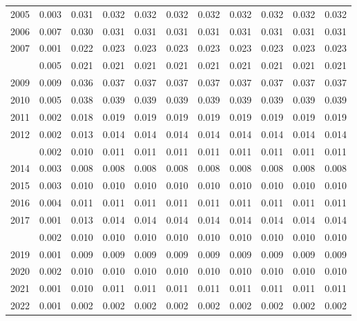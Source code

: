 \documentclass[
]{article}
\begin{document}
\begin{longtable}[t]{lrrrrrrrrrr}
2005 & 0.003 & 0.031 & 0.032 & 0.032 & 0.032 & 0.032 & 0.032 & 0.032 & 0.032 & 0.032\\
2006 & 0.007 & 0.030 & 0.031 & 0.031 & 0.031 & 0.031 & 0.031 & 0.031 & 0.031 & 0.031\\
2007 & 0.001 & 0.022 & 0.023 & 0.023 & 0.023 & 0.023 & 0.023 & 0.023 & 0.023 & 0.023\\
\addlinespace
2008 & 0.005 & 0.021 & 0.021 & 0.021 & 0.021 & 0.021 & 0.021 & 0.021 & 0.021 & 0.021\\
2009 & 0.009 & 0.036 & 0.037 & 0.037 & 0.037 & 0.037 & 0.037 & 0.037 & 0.037 & 0.037\\
2010 & 0.005 & 0.038 & 0.039 & 0.039 & 0.039 & 0.039 & 0.039 & 0.039 & 0.039 & 0.039\\
2011 & 0.002 & 0.018 & 0.019 & 0.019 & 0.019 & 0.019 & 0.019 & 0.019 & 0.019 & 0.019\\
2012 & 0.002 & 0.013 & 0.014 & 0.014 & 0.014 & 0.014 & 0.014 & 0.014 & 0.014 & 0.014\\
\addlinespace
2013 & 0.002 & 0.010 & 0.011 & 0.011 & 0.011 & 0.011 & 0.011 & 0.011 & 0.011 & 0.011\\
2014 & 0.003 & 0.008 & 0.008 & 0.008 & 0.008 & 0.008 & 0.008 & 0.008 & 0.008 & 0.008\\
2015 & 0.003 & 0.010 & 0.010 & 0.010 & 0.010 & 0.010 & 0.010 & 0.010 & 0.010 & 0.010\\
2016 & 0.004 & 0.011 & 0.011 & 0.011 & 0.011 & 0.011 & 0.011 & 0.011 & 0.011 & 0.011\\
2017 & 0.001 & 0.013 & 0.014 & 0.014 & 0.014 & 0.014 & 0.014 & 0.014 & 0.014 & 0.014\\
\addlinespace
2018 & 0.002 & 0.010 & 0.010 & 0.010 & 0.010 & 0.010 & 0.010 & 0.010 & 0.010 & 0.010\\
2019 & 0.001 & 0.009 & 0.009 & 0.009 & 0.009 & 0.009 & 0.009 & 0.009 & 0.009 & 0.009\\
2020 & 0.002 & 0.010 & 0.010 & 0.010 & 0.010 & 0.010 & 0.010 & 0.010 & 0.010 & 0.010\\
2021 & 0.001 & 0.010 & 0.011 & 0.011 & 0.011 & 0.011 & 0.011 & 0.011 & 0.011 & 0.011\\
2022 & 0.001 & 0.002 & 0.002 & 0.002 & 0.002 & 0.002 & 0.002 & 0.002 & 0.002 & 0.002\\*
\end{longtable}
\end{document}

